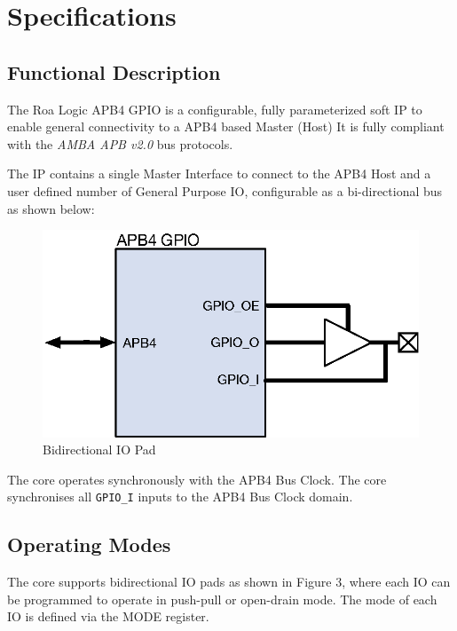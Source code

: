 \chapter{Specifications} \label{specifications}

\section{Functional Description}\label{functional-description}

The Roa Logic APB4 GPIO is a configurable, fully parameterized soft IP to
enable general connectivity to a APB4 based Master (Host) It is fully
compliant with the \emph{AMBA APB v2.0} bus protocols.

The IP contains a single Master Interface to connect to the APB4 Host
and a user defined number of General Purpose IO, configurable as a
bi-directional bus as shown below:

\begin{figure}[tbh]
	\centering
	\includegraphics{assets/img/apb4-gpio-sys}
	\caption{Bidirectional IO Pad}
	\label{fig:apb4-gpio-sys}
\end{figure}

The core operates synchronously with the APB4 Bus Clock. The core synchronises all \texttt{GPIO\_I} inputs to the APB4 Bus Clock domain.

\section{Operating Modes}\label{operating-modes}

The core supports bidirectional IO pads as shown in Figure 3, where each
IO can be programmed to operate in push-pull or open-drain mode. The mode of each IO is
defined via the MODE register.

